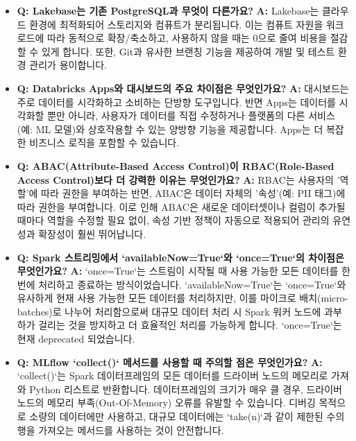 \documentclass[11pt,a4paper]{article}
\begin{document}
\begin{itemize}
    \item \textbf{Q: Lakebase는 기존 PostgreSQL과 무엇이 다른가요?}
    \textbf{A:} Lakebase는 클라우드 환경에 최적화되어 스토리지와 컴퓨트가 분리됩니다. 이는 컴퓨트 자원을 워크로드에 따라 동적으로 확장/축소하고, 사용하지 않을 때는 0으로 줄여 비용을 절감할 수 있게 합니다. 또한, Git과 유사한 브랜칭 기능을 제공하여 개발 및 테스트 환경 관리가 용이합니다.

    \item \textbf{Q: Databricks Apps와 대시보드의 주요 차이점은 무엇인가요?}
    \textbf{A:} 대시보드는 주로 데이터를 시각화하고 소비하는 단방향 도구입니다. 반면 Apps는 데이터를 시각화할 뿐만 아니라, 사용자가 데이터를 직접 수정하거나 플랫폼의 다른 서비스(예: ML 모델)와 상호작용할 수 있는 양방향 기능을 제공합니다. Apps는 더 복잡한 비즈니스 로직을 포함할 수 있습니다.

    \item \textbf{Q: ABAC(Attribute-Based Access Control)이 RBAC(Role-Based Access Control)보다 더 강력한 이유는 무엇인가요?}
    \textbf{A:} RBAC는 사용자의 '역할'에 따라 권한을 부여하는 반면, ABAC은 데이터 자체의 '속성'(예: PII 태그)에 따라 권한을 부여합니다. 이로 인해 ABAC은 새로운 데이터셋이나 컬럼이 추가될 때마다 역할을 수정할 필요 없이, 속성 기반 정책이 자동으로 적용되어 관리의 유연성과 확장성이 훨씬 뛰어납니다.

    \item \textbf{Q: Spark 스트리밍에서 `availableNow=True`와 `once=True`의 차이점은 무엇인가요?}
    \textbf{A:} `once=True`는 스트림이 시작될 때 사용 가능한 모든 데이터를 한 번에 처리하고 종료하는 방식이었습니다. `availableNow=True`는 `once=True`와 유사하게 현재 사용 가능한 모든 데이터를 처리하지만, 이를 마이크로 배치(micro-batches)로 나누어 처리함으로써 대규모 데이터 처리 시 Spark 워커 노드에 과부하가 걸리는 것을 방지하고 더 효율적인 처리를 가능하게 합니다. `once=True`는 현재 deprecated 되었습니다.

    \item \textbf{Q: MLflow `collect()` 메서드를 사용할 때 주의할 점은 무엇인가요?}
    \textbf{A:} `collect()`는 Spark 데이터프레임의 모든 데이터를 드라이버 노드의 메모리로 가져와 Python 리스트로 반환합니다. 데이터프레임의 크기가 매우 클 경우, 드라이버 노드의 메모리 부족(Out-Of-Memory) 오류를 유발할 수 있습니다. 디버깅 목적으로 소량의 데이터에만 사용하고, 대규모 데이터에는 `take(n)`과 같이 제한된 수의 행을 가져오는 메서드를 사용하는 것이 안전합니다.
\end{itemize}
\end{document}

